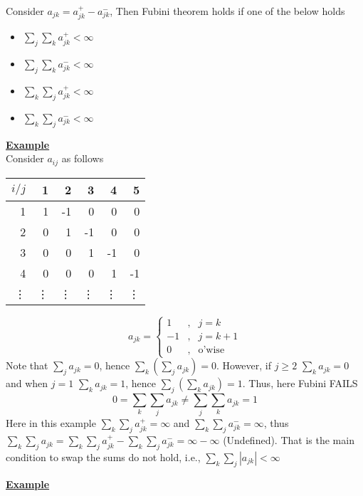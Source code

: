 \documentclass[11pt]{report}
\begin{document}
Consider  $a_{jk}=a^+_{jk}-a^-_{jk}$, Then Fubini theorem holds if one of the below holds
\begin{itemize}
\item$\sum_j\sum_ka^+_{jk}<\infty$
\item$\sum_j\sum_ka^-_{jk}<\infty$
\item$\sum_k\sum_ja^+_{jk}<\infty$
\item$\sum_k\sum_ja^-_{jk}<\infty$
\end{itemize}

\bigskip

\underline{{\bf {Example}}}  \\

Consider $a_{ij}$ as follows 

\bigskip
\begin{center}
\begin{tabular}{|r|rrrrr|}
\hline
 $i/j$&1&2&3&4&5\\
\hline
1&1&-1& 0&0&0 \\
2& 0&1&-1 &0&0\\
3& 0& 0&1&-1&0\\
4&0& 0& 0&1&-1\\
\vdots& \vdots&\vdots &\vdots &\vdots&\vdots \\
\hline
\end{tabular}
\end{center}


\begin{equation}
a_{jk}= \left\{ \begin{array}{rll}
1 & ,
& j=k \\ -1 & , & j=k+1 \\
0 & , & \mbox{o'wise}
\end{array}\right.\nonumber
\end{equation}
Note that $\sum_ja_{jk}=0$, hence $\sum_k\left(\sum_ja_{jk}\right)=0$. However, if $j \geq 2$ $\sum_ka_{jk}=0$ and when $j=1$  $\sum_ka_{jk}=1$, hence $\sum_j\left(\sum_ka_{jk}\right)=1$. Thus, here  Fubini FAILS
\begin{equation}
0=\sum_k\sum_ja_{jk}\neq \sum_j\sum_ka_{jk}=1\nonumber
\end{equation}
Here in this example $\sum_k\sum_ja^+_{jk}=\infty$ and $\sum_k\sum_ja^-_{jk}=\infty$, thus $\sum_k\sum_ja_{jk}=\sum_k\sum_ja^+_{jk}-\sum_k\sum_ja^-_{jk}=\infty-\infty$  (Undefined). That is the main condition to swap the sums do not hold, i.e., $\sum_k\sum_j|a_{jk}|<\infty$

\bigskip

\underline{{\bf {Example}}}  \\
\end{document}
